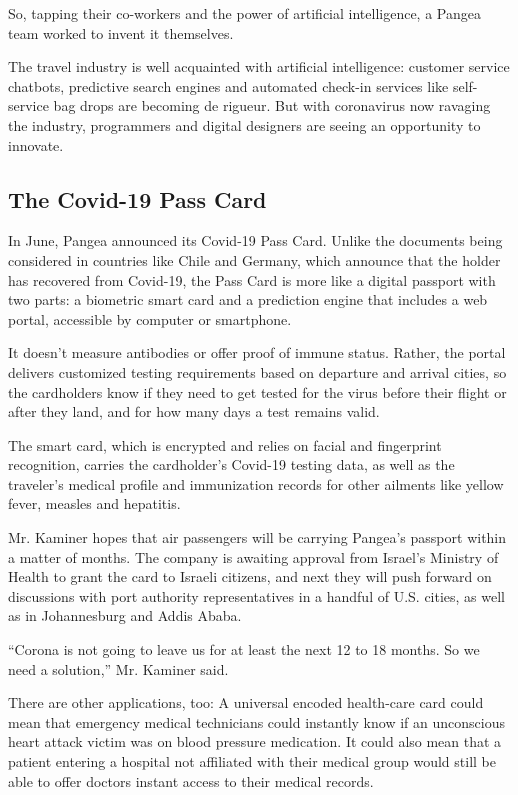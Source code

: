 So, tapping their co-workers and the power of artificial intelligence, a
Pangea team worked to invent it themselves.

The travel industry is well acquainted with artificial intelligence:
customer service chatbots, predictive search engines and automated
check-in services like self-service bag drops are becoming de rigueur.
But with coronavirus now ravaging the industry, programmers and digital
designers are seeing an opportunity to innovate.

\hypertarget{the-covid-19-pass-card}{%
\subsection{The Covid-19 Pass Card}\label{the-covid-19-pass-card}}

In June, Pangea announced its Covid-19 Pass Card. Unlike the documents
being considered in countries like Chile and Germany, which announce
that the holder has recovered from Covid-19, the Pass Card is more like
a digital passport with two parts: a biometric smart card and a
prediction engine that includes a web portal, accessible by computer or
smartphone.

It doesn't measure antibodies or offer proof of immune status. Rather,
the portal delivers customized testing requirements based on departure
and arrival cities, so the cardholders know if they need to get tested
for the virus before their flight or after they land, and for how many
days a test remains valid.

The smart card, which is encrypted and relies on facial and fingerprint
recognition, carries the cardholder's Covid-19 testing data, as well as
the traveler's medical profile and immunization records for other
ailments like yellow fever, measles and hepatitis.

Mr. Kaminer hopes that air passengers will be carrying Pangea's passport
within a matter of months. The company is awaiting approval from
Israel's Ministry of Health to grant the card to Israeli citizens, and
next they will push forward on discussions with port authority
representatives in a handful of U.S. cities, as well as in Johannesburg
and Addis Ababa.

``Corona is not going to leave us for at least the next 12 to 18 months.
So we need a solution,'' Mr. Kaminer said.

There are other applications, too: A universal encoded health-care card
could mean that emergency medical technicians could instantly know if an
unconscious heart attack victim was on blood pressure medication. It
could also mean that a patient entering a hospital not affiliated with
their medical group would still be able to offer doctors instant access
to their medical records.

